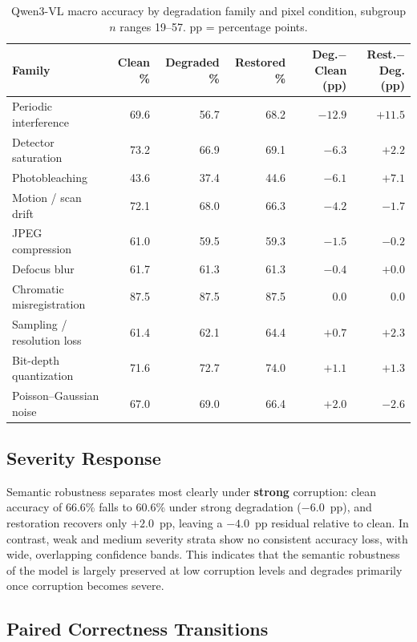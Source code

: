 \documentclass[11pt]{article}
\begin{document}
\begin{table}[h]
\centering
\small
\begin{tabular}{@{}l r r r r r@{}}
\toprule
\textbf{Family} & \textbf{Clean \%} & \textbf{Degraded \%} & \textbf{Restored \%} &
\textbf{Deg.$-$Clean (pp)} & \textbf{Rest.$-$Deg. (pp)} \\
\midrule
Periodic interference & 69.6 & 56.7 & 68.2 & $-12.9$ & $+11.5$ \\
Detector saturation & 73.2 & 66.9 & 69.1 & $-6.3$ & $+2.2$ \\
Photobleaching & 43.6 & 37.4 & 44.6 & $-6.1$ & $+7.1$ \\
Motion / scan drift & 72.1 & 68.0 & 66.3 & $-4.2$ & $-1.7$ \\
JPEG compression & 61.0 & 59.5 & 59.3 & $-1.5$ & $-0.2$ \\
Defocus blur & 61.7 & 61.3 & 61.3 & $-0.4$ & $+0.0$ \\
Chromatic misregistration & 87.5 & 87.5 & 87.5 & $0.0$ & $0.0$ \\
Sampling / resolution loss & 61.4 & 62.1 & 64.4 & $+0.7$ & $+2.3$ \\
Bit-depth quantization & 71.6 & 72.7 & 74.0 & $+1.1$ & $+1.3$ \\
Poisson--Gaussian noise & 67.0 & 69.0 & 66.4 & $+2.0$ & $-2.6$ \\
\bottomrule
\end{tabular}
\caption{Qwen3-VL macro accuracy by degradation family and pixel condition,
subgroup $n$ ranges 19--57. pp = percentage points.}
\label{tab:vlm_family}
\end{table}

\subsection{Severity Response}

Semantic robustness separates most clearly under \textbf{strong} corruption: clean
accuracy of 66.6\% falls to 60.6\% under strong degradation ($-6.0$~pp), and restoration
recovers only $+2.0$~pp, leaving a $-4.0$~pp residual relative to clean. In contrast,
weak and medium severity strata show no consistent accuracy loss, with wide, overlapping
confidence bands. This indicates that the semantic robustness of the model is largely
preserved at low corruption levels and degrades primarily once corruption becomes
severe.

\subsection{Paired Correctness Transitions}
\end{document}
